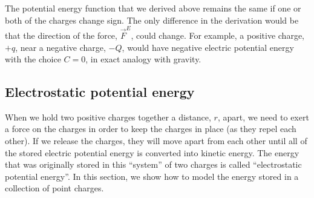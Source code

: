 The potential energy function that we derived above remains the same if one or both of the charges change sign. The only difference in the derivation would be that the direction of the force, $\vec F^E$, could change. For example, a positive charge, $+q$, near a negative charge, $-Q$, would have negative electric potential energy with the choice $C=0$, in exact analogy with gravity.

\subsection{Electrostatic potential energy}
When we hold two positive charges together a distance, $r$, apart, we need to exert a force on the charges in order to keep the charges in place (as they repel each other). If we release the charges, they will move apart from each other until all of the stored electric potential energy is converted into kinetic energy. The energy that was originally stored in this ``system'' of two charges is called ``electrostatic potential energy''. In this section, we show how to model the energy stored in a collection of point charges.

